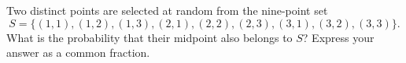 Two distinct points are selected at random from the nine-point set
\[
S=\{(1,1),(1,2),(1,3),(2,1),(2,2),(2,3),(3,1),(3,2),(3,3)\}.
\]
What is the probability that their midpoint also belongs to $S$? Express your answer as a common fraction.
